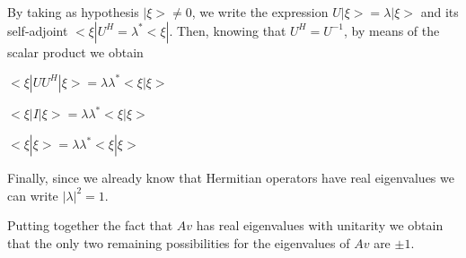 \documentclass[12pt]{report}
\begin{document}
\begin{minipage}{1\textwidth}
		
		By taking as hypothesis $|\xi> \neq 0$, we write the expression $U |\xi> = \lambda |\xi>$ and its self-adjoint $<\xi| U^H = \lambda^* <\xi|$. Then, knowing that $U^H=U^{-1}$, by means of the scalar product we obtain \newline
		
		\begin{center}
			$<\xi|U U^H|\xi> = \lambda \lambda^* <\xi |\xi>$\newline
			
			$<\xi|I|\xi> = \lambda \lambda^* <\xi |\xi>$\newline
			
			$<\xi|\xi> = \lambda \lambda^* <\xi |\xi>$\newline
		\end{center}
		
		Finally, since we already know that Hermitian operators have real eigenvalues we can write $|\lambda|^2 = 1$.\newline
		
		Putting together the fact that $Av$ has real eigenvalues with unitarity we obtain that the only two remaining possibilities for the eigenvalues of $Av$ are $\pm 1$. \newline
		
		
		
	\end{minipage}
	
\end{document}
